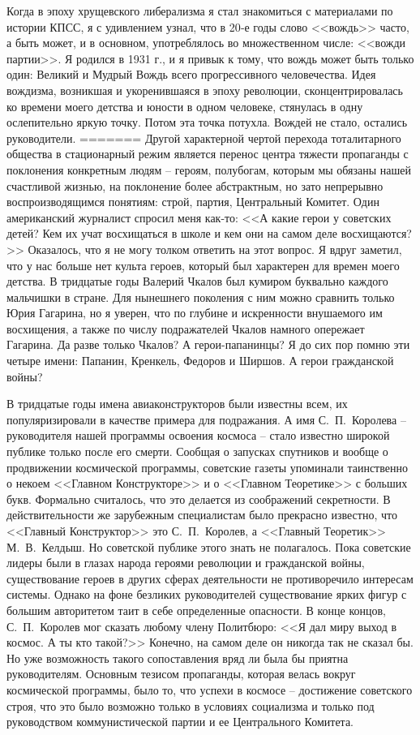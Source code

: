 \documentclass{book}
\begin{document}
Когда в эпоху хрущевского либерализма я стал знакомиться с материалами по истории КПСС, я с удивлением узнал, что в 20‑е годы слово <<вождь>> часто, а быть может, и в основном, употреблялось во множественном числе: <<вожди партии>>. Я родился в 1931 г., и я привык к тому, что вождь может быть только один: Великий и Мудрый Вождь всего прогрессивного человечества. Идея вождизма, возникшая и укоренившаяся в эпоху революции, сконцентрировалась ко времени моего детства и юности в одном человеке, стянулась в одну ослепительно яркую точку. Потом эта точка потухла. Вождей не стало, остались руководители.
=======
Другой характерной чертой перехода тоталитарного общества в стационарный режим является перенос центра тяжести пропаганды с поклонения конкретным людям -- героям, полубогам, которым мы обязаны нашей счастливой жизнью, на поклонение более абстрактным, но зато непрерывно воспроизводящимся понятиям: строй, партия, Центральный Комитет. Один американский журналист спросил меня как-то: <<А какие герои у советских детей? Кем их учат восхищаться в школе и кем они на самом деле восхищаются?>> Оказалось, что я не могу толком ответить на этот вопрос. Я вдруг заметил, что у нас больше нет культа героев, который был характерен для времен моего детства. В тридцатые годы Валерий Чкалов был кумиром буквально каждого мальчишки в стране. Для нынешнего поколения с ним можно сравнить только Юрия Гагарина, но я уверен, что по глубине и искренности внушаемого им восхищения, а также по числу подражателей Чкалов намного опережает Гагарина. Да разве только Чкалов? А герои-папанинцы? Я до сих пор помню эти четыре имени: Папанин, Кренкель, Федоров и Ширшов. А герои гражданской войны?

В тридцатые годы имена авиаконструкторов были известны всем, их популяризировали в качестве примера для подражания. А имя С.~П.~Королева -- руководителя нашей программы освоения космоса -- стало известно широкой публике только после его смерти. Сообщая о запусках спутников и вообще о продвижении космической программы, советские газеты упоминали таинственно о некоем <<Главном Конструкторе>> и о <<Главном Теоретике>> с больших букв. Формаль­но считалось, что это делается из соображений секретности. В действительности же зарубежным специалистам было прекрасно известно, что <<Главный Конструктор>> это С.~П.~Королев, а <<Главный Теоретик>> М.~В.~Келдыш. Но советской публике этого знать не полагалось. Пока советские лидеры были в глазах народа героями революции и гражданской войны, существование героев в других сферах деятельности не противоречило интересам системы. Однако на фоне безликих руководителей существование ярких фигур с большим автори­тетом таит в себе определенные опасности. В конце концов, С.~П.~Королев мог сказать любому члену Политбюро: <<Я дал миру выход в космос. А ты кто такой?>> Конечно, на самом деле он никогда так не сказал бы. Но уже возможность такого со­поставления вряд ли была бы приятна руководителям. Основным тезисом пропаганды, которая велась вокруг космической программы, было то, что успехи в космосе -- достижение советского строя, что это было возможно только в условиях социализма и только под руководством коммунистической партии и ее Центрального Комитета.
\end{document}

